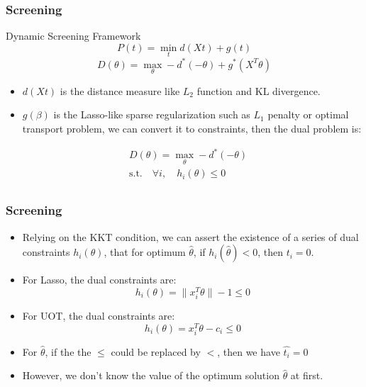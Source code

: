 \documentclass[dvipdfmx,cjk,t,10pt]{beamer}
\begin{document}
\begin{frame}
\frametitle{Screening}
	\begin{screen}{Dynamic Screening Framework \cite{NEURIPS2021_7b5b23f4}}
	$$
	P(t) = \min_{t} d(Xt) + g(t)
	$$
	$$
	D(\theta) = \max_{\theta} -d^{*}(-\theta) + g^{*}(X^{T}\theta)
	$$
	\end{screen}	
		\begin{itemize}
		\item $d(Xt)$ is the distance measure like $L_2$ function and KL divergence.
		\item $g(\beta)$ is the Lasso-like sparse regularization such as $L_1$ penalty or optimal transport problem, we can convert it to constraints, then the dual problem is:  
	\end{itemize}
			$$
	\begin{aligned}
			&D(\theta) =  \max_{\theta}-d^{*}(-\theta)\\
			&\text{s.t.}\quad \forall i,\quad  h_{i}(\theta)\leq 0\\  
	\end{aligned}
		$$
\end{frame}

\begin{frame}
\frametitle{Screening}	
		\begin{itemize}
		 \item Relying on the KKT condition, we can assert the existence of a series of dual constraints $h_{i}(\theta)$, that for optimum $\hat{\theta}$, if $h_{i}(\hat{\theta})<0$, then $t_i=0$. 
		 \item For Lasso, the dual constraints are: 
		$$
		{h_{i}(\theta)=\|x_i^{T}\theta\| - 1 \leq 0} 
		$$
		\item For UOT, the dual constraints are: 
		$$
		{h_{i}(\theta)=x_i^{T}\theta - c_i \leq 0} 
		$$
		\item For $\hat{\theta}$, if the the $\leq$ could be replaced by $<$, then  we have ${\hat{t_{i}}} = 0$
		\item However, we don't know the value of the optimum solution $\hat{\theta}$ at first.
		\end{itemize}
\end{frame}
\end{document}

